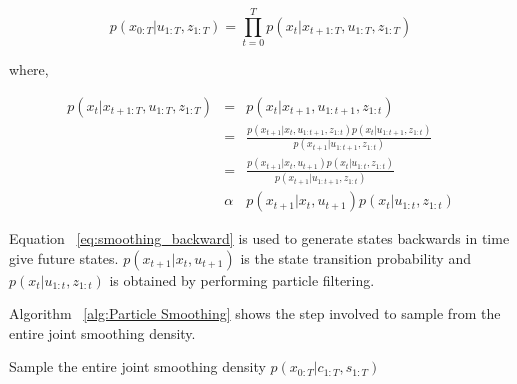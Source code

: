 \documentclass[12pt]{dalcsthesis}
\begin{document}
\begin{equation}
p(x_{0:T}|u_{1:T},z_{1:T})=\prod_{t=0}^{T}p(x_{t}|x_{t+1:T},u_{1:T},z_{1:T})
\end{equation}

where,

\begin{eqnarray}
p(x_{t}|x_{t+1:T},u_{1:T},z_{1:T}) & = & p(x_{t}|x_{t+1},u_{1:t+1},z_{1:t})\\
 & = & \frac{p(x_{t+1}|x_{t},u_{1:t+1},z_{1:t})p(x_{t}|u_{1:t+1},z_{1:t})}{p(x_{t+1}|u_{1:t+1},z_{1:t})}\\
 & = & \frac{p(x_{t+1}|x_{t},u_{t+1})p(x_{t}|u_{1:t},z_{1:t})}{p(x_{t+1}|u_{1:t+1},z_{1:t})}\\
\label{eq:smoothing_backward} & \alpha & p(x_{t+1}|x_{t},u_{t+1})p(x_{t}|u_{1:t},z_{1:t})
\end{eqnarray}

Equation ~\ref{eq:smoothing_backward} is used to generate states backwards in time give future states. $p(x_{t+1}|x_{t},u_{t+1})$ is the state transition probability and $p(x_{t}|u_{1:t},z_{1:t})$ is obtained by performing particle filtering. 

Algorithm ~\ref{alg:Particle Smoothing} shows the step involved to sample from the entire joint smoothing density.

\begin{algorithm}[H]
 \SetAlgoLined
  	\label{alg:Particle Smoothing}
	\caption{Sample the entire joint smoothing density $p(x_{0:T}|c_{1:T},s_{1:T})$}
	
\end{algorithm}
\end{document}
